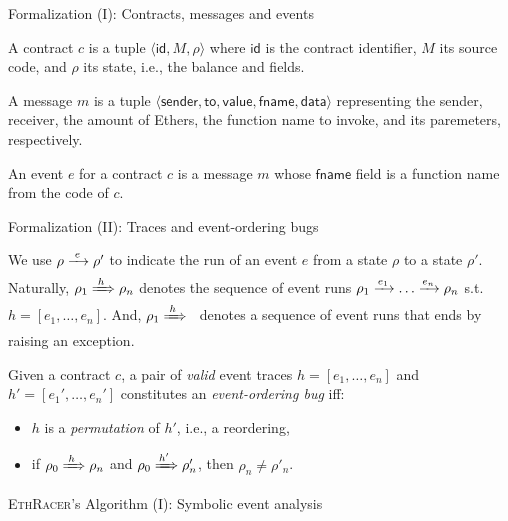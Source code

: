 \documentclass[9pt]{beamer}
\begin{document}
\begin{frame}{Formalization (I): Contracts, messages and events}
  \begin{definition}[Contract]
    A contract $c$ is a tuple $\langle \mathsf{id}, M, \rho \rangle$
    where $\mathsf{id}$ is the contract identifier, $M$ its source
    code, and $\rho$ its state, i.e., the balance and fields.
  \end{definition}
  \pause
  \begin{definition}[Message]
    A message $m$ is a tuple
    $\langle \mathsf{sender}, \mathsf{to}, \mathsf{value},
    \mathsf{fname}, \mathsf{data} \rangle$ representing the sender,
    receiver, the amount of Ethers, the function name to invoke, and
    its paremeters, respectively.
  \end{definition}
  \pause
  \begin{definition}[Event]
    An event $e$ for a contract $c$ is a message $m$ whose
    $\mathsf{fname}$ field is a function name from the code of $c$.
  \end{definition}
\end{frame}
%
\begin{frame}{Formalization (II): Traces and event-ordering bugs}
  \begin{definition}[Trace]
    We use $\rho \estep{e} \rho'$ to indicate the run of an event
    $e$ from a state $\rho$ to a state $\rho'$.
    Naturally, $\rho_1 \tstep{h} \rho_n$ denotes the sequence of event
    runs $\rho_1 \estep{e_1} \ldots \estep{e_n} \rho_n$
    s.t.~$h = [e_1,\ldots,e_n]$.
    And, $\rho_1 \tstep{h}$ \Lightning\ denotes a sequence of event runs
    that ends by raising an exception.
  \end{definition}
  \pause
  \begin{definition}
    Given a contract $c$, a pair of \emph{valid} event traces
    $h = [e_1,\ldots,e_n]$ and $h' = [e_1',\ldots,e_n']$
    constitutes an \emph{event-ordering bug} iff:
    \begin{itemize}
    \item $h$ is a \emph{permutation} of $h'$, i.e., a reordering,
    \item if $\rho_0 \tstep{h} \rho_n$ and
      $\rho_0 \tstep{h'} \rho'_n$, then $\rho_n \neq \rho'_n$.
    \end{itemize}
  \end{definition}
\end{frame}
%
\begin{frame}{\textsc{EthRacer}'s Algorithm (I): Symbolic event analysis}
\end{frame}
\end{document}
